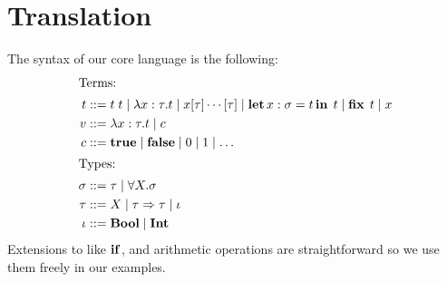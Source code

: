 \section{Translation}
\label{sec:formalization}


The syntax of our core language is the following:
\newcommand{\alt}{\mid}
\begin{align*}
\shortintertext{Terms:}
t       &::= t\;t \alt \func{x: \tau}{t} \alt x[\tau]\dotsm[\tau] \alt \llet{x:
  \sigma}{t}{t} \alt \kfix\;t \alt x \\
v       &::= \func{x: \tau}{t} \alt c\\
c       &::= \ktrue \alt \kfalse \alt 0 \alt 1 \alt \dots\\
\shortintertext{Types:}
\sigma  &::= \tau \alt \univ{X}{\sigma}\\
\tau    &::= X \alt \Func{\tau}{\tau} \alt \btyp\\
\btyp   &::= \kbool \alt \kint
\end{align*}
Extensions to \calculus like $\operatorname{\mathbf{if}}$, and arithmetic operations are straightforward so we use them freely in our examples.



